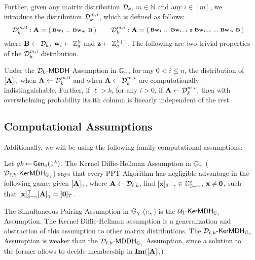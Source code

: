 Further, given any matrix distribution $\mathcal{D}_{k}$, $m \in \mathbb{N}$ and any $i \in [m]$, we introduce the distribution $\mathcal{D}_k^{m,i}$, which is defined as follows: 
\[ \mathcal{D}_k^{m,0}: \mathbf{{A}} = \left(\begin{smallmatrix} \mathbf{{B}}\mathbf{w}_1 & \ldots &  
  \mathbf{{B}}\mathbf{w}_{m} & \mathbf{{B}}  \end{smallmatrix} \right)  \qquad
\mathcal{D}_k^{m,i}:\mathbf{{A}} = \left(\begin{smallmatrix} \mathbf{{B}}\mathbf{w}_1 & \ldots & \mathbf{{B}}\mathbf{w}_{i-1} 
& \mathbf{z} &  \mathbf{{B}}\mathbf{w}_{i+1} & \ldots &  
  \mathbf{{B}}\mathbf{w}_{m} & \mathbf{{B}}  \end{smallmatrix} \right) 
\]
where $\mathbf{{B}} \leftarrow \mathcal{D}_{k}$, $\mathbf{w}_i \leftarrow \mathbb{Z}_q^k$ and $\mathbf{z} \leftarrow \mathbb{Z}_q^{k+1}$. The following are two trivial properties of the $\mathcal{D}_k^{m,i}$ distribution. 

\begin{lemma} Under the $\mathcal{D}_{k}$-$\mathsf{MDDH}$ Assumption in $\mathbb{G}_\gamma$, for any $0 < i \leq n$, the distribution of  $[\mathbf{{A}}]_\gamma$ when $\mathbf{{A}} \leftarrow \mathcal{D}_k^{m,0}$ and when $\mathbf{{A}} \leftarrow \mathcal{D}_k^{m,i}$ are computationally indistinguishable. Further, if $\ell>k$, for any $i>0$, if $\mathbf{{A}} \leftarrow \mathcal{D}_k^{m,i}$, then with overwhelming probability its ith column is linearly independent of the rest. \label{lemma:dist-i}
\end{lemma}

\subsection{Computational Assumptions}
Additionally, we will be using the following family  computational assumptions:
\begin{definition}Let  ${gk} 
\hspace*{-1pt}
\gets
\hspace*{-1pt}
\mathsf{Gen}_a(1^\lambda)$.
The Kernel Diffie-Hellman Assumption in $\mathbb{G}_\gamma$  ($\mathcal{D}_{\ell,k}\mbox{-}\mathsf{KerMDH}_{\mathbb{G}_\gamma}$) says that every PPT Algorithm has negligible advantage in the following  game: given $[\mathbf{{A}}]_\gamma$, where $\mathbf{{A}} \gets \mathcal{D}_{\ell,k}$, find $[\mathbf{x}]_{3-\gamma} \in \mathbb{G}_{3-\gamma}^{\ell}$, $\mathbf{x} \neq \mathbf{0}$, such that 
$[\mathbf{x}]_{3-\gamma}^{\top}[\mathbf{{A}}]_{\gamma}=[\mathbf{0}]_T$. 
\end{definition}

The  Simultaneous Pairing Assumption in $\mathbb{G}_\gamma$  (\SP$_{\mathbb{G}_{\gamma}}$) is the $ \mathcal{U}_1\mbox{-}\mathsf{KerMDH}_{\mathbb{G}_{\gamma}}$ Assumption. The Kernel Diffie-Hellman assumption is a generalization and abstraction of this assumption to other matrix distributions. 
The $\mathcal{D}_{\ell,k}\mbox{-}\mathsf{KerMDH}_{\mathbb{G}_{\gamma}}$ Assumption is weaker than the $\mathcal{D}_{\ell,k}\mbox{-}\mathsf{MDDH}_{\mathbb{G}_{\gamma}}$ Assumption, since a solution to the former allows to decide membership in $\mathbf{Im}([\mathbf{{A}}]_{\gamma})$.

